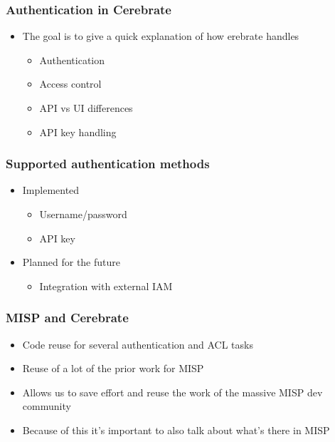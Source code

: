 
\begin{frame}[t,plain]
\titlepage
\end{frame}

\begin{frame}
	\frametitle{Authentication in Cerebrate}
	\begin{itemize}
                \item The goal is to give a quick explanation of how erebrate handles
                \begin{itemize}
                    \item Authentication
                    \item Access control
                    \item API vs UI differences
                    \item API key handling
                \end{itemize}
	\end{itemize}
\end{frame}

\begin{frame}
	\frametitle{Supported authentication methods}
	\begin{itemize}
                \item Implemented
                \begin{itemize}
                    \item Username/password
                    \item API key
                \end{itemize}
                \item Planned for the future
                \begin{itemize}
                    \item Integration with external IAM
                \end{itemize}
	\end{itemize}
\end{frame}

\begin{frame}
  \frametitle{MISP and Cerebrate}
  \begin{itemize}
      \item Code reuse for several authentication and ACL tasks
      \item Reuse of a lot of the prior work for MISP
      \item Allows us to save effort and reuse the work of the massive MISP dev community
      \item Because of this it's important to also talk about what's there in MISP
  \end{itemize}
\end{frame}

